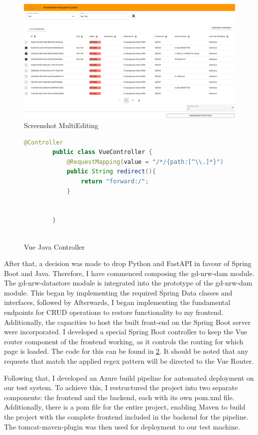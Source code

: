 \documentclass[11pt, titlepage, a4paper]{article}
\begin{document}
\begin{figure}[t]
	\caption{Screenshot MultiEditing}
	\label{fig:multiedit}
	\includegraphics[width=16cm]{multiedit.png}
	\centering
\end{figure}
\begin{figure}[t]
	\caption{Vue Java Controller}
	\label{fig:vue}
	\begin{lstlisting}[language=java, frame=single]
        @Controller
        public class VueController {
            @RequestMapping(value = "/*/{path:[^\\.]*}")
            public String redirect(){
                return "forward:/";
            }
        
        
        }
        
        \end{lstlisting}
	\centering
\end{figure}


After that, a decision was made to drop Python and FastAPI in favour of Spring Boot and Java. Therefore, I have commenced composing the gd-nrw-dam module. The gd-nrw-datastore module is integrated into the prototype of the gd-nrw-dam module. This began by implementing the required Spring Data classes and interfaces, followed by Afterwards, I began implementing the fundamental endpoints for CRUD operations to restore functionality to my frontend. Additionally, the capacities to host the built front-end on the Spring Boot server were incorporated. I developed a special Spring Boot controller to keep the Vue router component of the frontend working, as it controls the routing for which page is loaded. The code for this can be found in \ref{fig:vue}. It should be noted that any requests that match the applied regex pattern will be directed to the Vue Router. 

Following that, I developed an Azure build pipeline for automated deployment on our test system.  To achieve this, I restructured the project into two separate components: the frontend and the backend, each with its own pom.xml file. Additionally, there is a pom file for the entire project, enabling Maven to build the project with the complete frontend included in the backend for the pipeline. The tomcat-maven-plugin was then used for deployment to our test machine.
\end{document}
